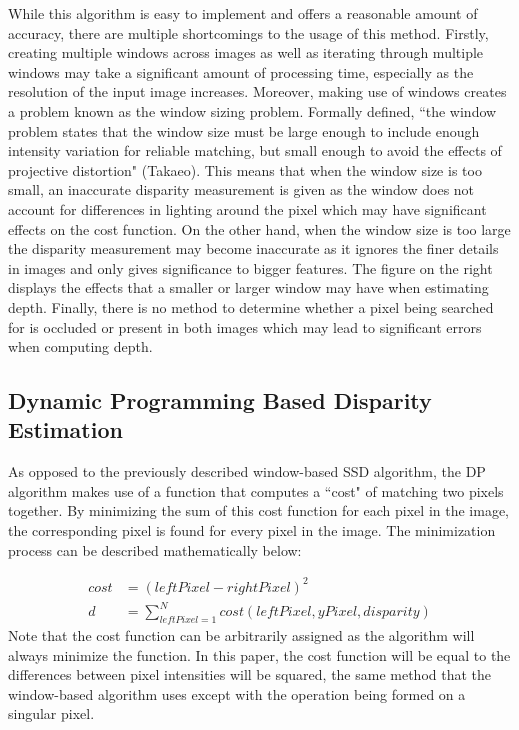 \documentclass[11pt]{scrartcl}
\begin{document}
While this algorithm is easy to implement and offers a reasonable amount of accuracy, there are multiple shortcomings to the usage of this method. Firstly, creating multiple windows across images as well as iterating through multiple windows may take a significant amount of processing time, especially as the resolution of the input image increases. Moreover, making use of windows creates a problem 
known as the window sizing problem. Formally defined, ``the window problem states that the window size must be large enough to include enough intensity variation for reliable matching, but small enough to avoid the effects of projective distortion" (Takaeo). This means that when the 
window size is too small, an inaccurate disparity measurement is given as the window does not account for differences in lighting around the pixel which may have significant effects on the cost function. On the other hand, when the window size is too large the disparity measurement may become inaccurate as it ignores the finer details in images and only gives significance to bigger features. The figure on the right displays the 
effects that a smaller or larger window may have when estimating depth. Finally, there is no method to determine whether a pixel being searched for is occluded or present in both images which may lead to significant errors when computing depth. 

\subsection{Dynamic Programming Based Disparity Estimation}
As opposed to the previously described window-based SSD algorithm, the DP algorithm makes use of a function that computes a ``cost" of matching two pixels together. By minimizing the sum of this cost function for each pixel in the image, the corresponding pixel is found for every pixel in the image. The minimization process can be described mathematically below:

\begin{theorem}
	\begin{align}
		cost & =  (leftPixel - rightPixel)^2                                          \\
		d    & = \displaystyle\sum_{leftPixel=1}^{N} cost(leftPixel,yPixel,disparity) 
	\end{align}
	Note that the cost function can be arbitrarily assigned as the algorithm will always minimize the function. In this paper, the cost function will be equal to the differences between pixel intensities will be squared, the same method that the window-based algorithm uses except with the operation being formed on a singular pixel. 
\end{theorem}
\end{document}
